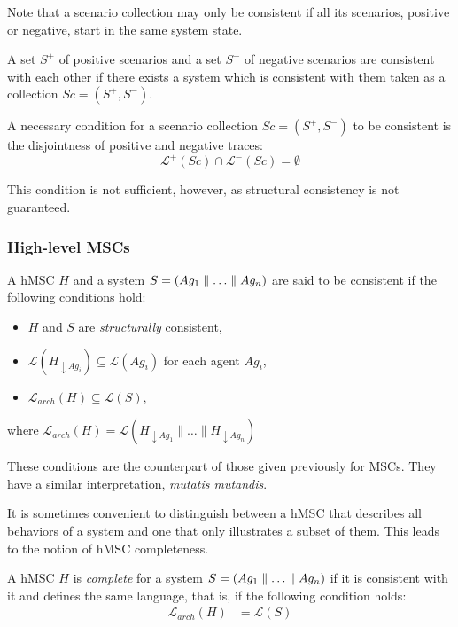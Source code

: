 Note that a scenario collection may only be consistent if all its scenarios, positive or negative, start in the same system state.

A set $S^+$ of positive scenarios and a set $S^-$ of negative scenarios are consistent with each other if there exists a system which is consistent with them taken as a collection $Sc = (S^+,S^-)$. 

A necessary condition for a scenario collection $Sc = (S^+,S^-)$ to be consistent is the disjointness of positive and negative traces:
\begin{equation}
\mathcal{L}^+(Sc) \cap \mathcal{L}^-(Sc) = \emptyset
\end{equation}

This condition is not sufficient, however, as structural consistency is not guaranteed.

\subsubsection*{High-level MSCs}

A hMSC $H$ and a system $S = (Ag_1 \parallel \ldots \parallel Ag_n)$ are said to be consistent if the following conditions hold:
\begin{itemize}
\item $H$ and $S$ are \emph{structurally} consistent,
\item $\mathcal{L}(H_{\downarrow Ag_i}) \subseteq \mathcal{L}(Ag_i)$ for each agent $Ag_i$,
\item $\mathcal{L}_{arch}(H) \subseteq \mathcal{L}(S)$,
\end{itemize}
where $\mathcal{L}_{arch}(H) = \mathcal{L}(H_{\downarrow Ag_1} \parallel \ldots \parallel H_{\downarrow Ag_n})$

These conditions are the counterpart of those given previously for MSCs. They have a similar interpretation, \emph{mutatis mutandis}. 

It is sometimes convenient to distinguish between a hMSC that describes all behaviors of a system and one that only illustrates a subset of them. This leads to the notion of hMSC completeness. 

A hMSC $H$ is \emph{complete} for a system $S = (Ag_1 \parallel \ldots \parallel Ag_n)$ if it is consistent with it and defines the same language, that is, if the following condition holds:
\begin{align}
\mathcal{L}_{arch}(H) &= \mathcal{L}(S)
\end{align}

